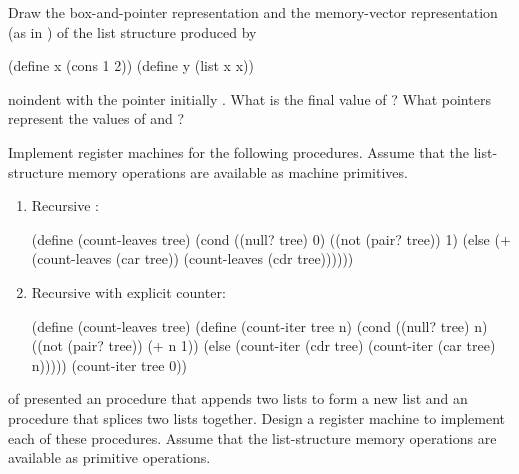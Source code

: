 \begin{exercise}
	\label{Exercise 5.20}
	Draw the box-and-pointer representation and the memory-vector representation (as in ) of the list structure produced by
	\begin{scheme}
	  (define x (cons 1 2))
	  (define y (list x x))
	\end{scheme}
	noindent
	with the  pointer initially .
	What is the final value of  ?
	What pointers represent the values of  and  ?
\end{exercise}



\begin{exercise}
	\label{Exercise 5.21}
	Implement register machines for the following procedures.
	Assume that the list-structure memory operations are available as machine primitives.
	\begin{enumerate}[label = \alph*., leftmargin = *]

		\item
			Recursive :
			\begin{scheme}
			  (define (count-leaves tree)
			    (cond ((null? tree) 0)
			          ((not (pair? tree)) 1)
			          (else (+ (count-leaves (car tree))
			                   (count-leaves (cdr tree))))))
			\end{scheme}

		\item
			Recursive  with explicit counter:
			\begin{scheme}
			  (define (count-leaves tree)
			    (define (count-iter tree n)
			      (cond ((null? tree) n)
			            ((not (pair? tree)) (+ n 1))
			            (else
			             (count-iter (cdr tree)
			                         (count-iter (car tree)
			                                     n)))))
			    (count-iter tree 0))
			\end{scheme}

	\end{enumerate}
\end{exercise}



\begin{exercise}
	\label{Exercise 5.22}
	 of  presented an  procedure that appends two lists to form a new list and an  procedure that splices two lists together.
	Design a register machine to implement each of these procedures.
	Assume that the list-structure memory operations are available as primitive operations.
\end{exercise}



